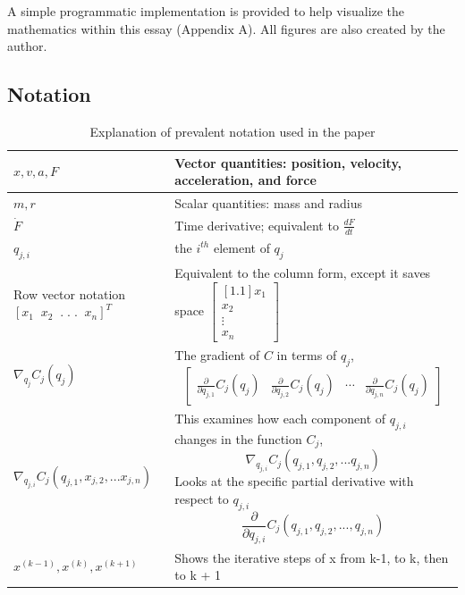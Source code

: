 \documentclass[12pt, letterpaper]{article}
\begin{document}
A simple programmatic implementation is provided to help visualize the mathematics within this essay ($\text{Appendix A}$). All figures are also created by the author.
\subsection{Notation}
\def\arraystretch{2}%
\begin{table}[H]
\begin{tabular}{ | m{10em} | m{11.5cm}| }
  \hline
  $x, v, a, F$ & Vector quantities: position, velocity, acceleration, and force \\ 
  \hline
  $m, r$ & Scalar quantities: mass and radius \\ 
  \hline
  $\dot{F}$ & Time derivative; equivalent to $\frac{dF}{dt}$  \\ 
    \hline
  $q_{j,i}$ & the $i^{th}$ element of $q_j$  \\ 
  \hline
  Row vector notation $\left[ x_{1}\;\; x_{2}\;\; .\; . \; .\;\;  x_{n}  \right] ^{T}$ & Equivalent to the column form, except it saves space $\begin{bmatrix}[1.1]x_{1} \\x_{2} \\ \vdots \\ x_{n}  \end{bmatrix}$ \\ 
  \hline
  $\nabla_{q_j} C_j(q_j)$ & The gradient of $C$ in terms of $q_j$, $$\begin{bmatrix} \frac{\partial}{\partial q_{j,1}} C_j(q_j)& \frac{\partial}{\partial q_{j,2}} C_j(q_j) & \cdots &  \frac{\partial}{\partial q_{j,n}} C_j(q_j)\end{bmatrix}$$ \\
  \hline
  $\nabla_{q_{j,i}}C_j(q_{j,1},x_{j,2},...x_{j,n})$ & This examines how each component of $q_{j,i}$ changes in the function $C_j$, $$\nabla_{q_{j,i}}C_j(q_{j,1},q_{j,2},...q_{j,n})$$ Looks at the specific partial derivative with respect to $q_{j,i}$
$$\frac{\partial}{\partial q_{j,i}} C_j(q_{j,1},q_{j,2}, . . ., q_{j,n})$$ \\
\hline
$x^{(k-1)}, x^{(k)}, x^{(k + 1)} $ & Shows the iterative steps of x from k-1, to k, then to k + 1\\
\hline
\end{tabular}
\centering
\caption{Explanation of prevalent notation used in the paper}
\label{table:table}
\end{table}
\clearpage
\end{document}
